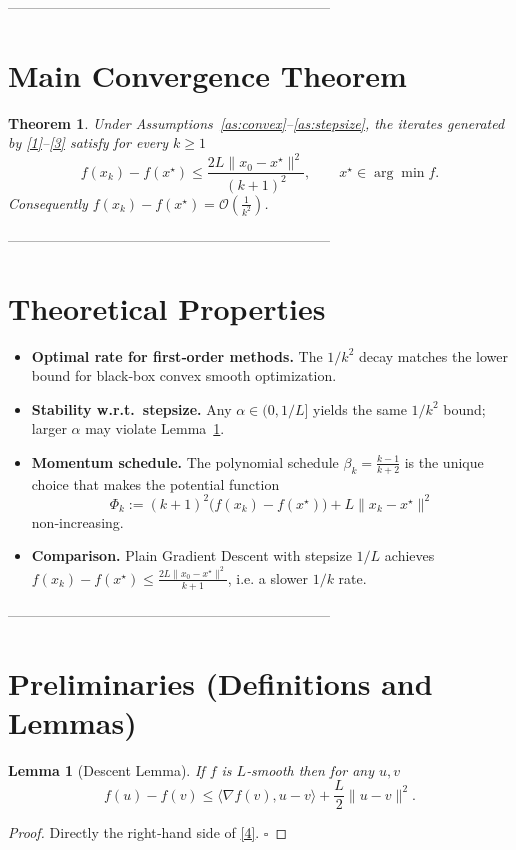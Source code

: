 \documentclass{article}
\newtheorem{theorem}{Theorem}
\newtheorem{lemma}{Lemma}
\newcommand{\grad}{\nabla}
\begin{document}
---------------------------------------------------------------------

\section*{Main Convergence Theorem}
\begin{theorem}\label{thm:rate}
Under Assumptions~\ref{as:convex}–\ref{as:stepsize}, the iterates generated by \eqref{1}–\eqref{3} satisfy for every $k\ge 1$
\[
f(x_k)-f(x^\star)\le \frac{2L\|x_0-x^\star\|^2}{(k+1)^2},
\qquad x^\star\in\arg\min f .
\tag{5}
\]
Consequently $f(x_k)-f(x^\star)=\mathcal{O}\!\left(\frac{1}{k^{2}}\right)$.
\end{theorem}

---------------------------------------------------------------------

\section*{Theoretical Properties}
\begin{itemize}
\item \textbf{Optimal rate for first‑order methods.}  The $1/k^{2}$ decay matches the lower bound for black‑box convex smooth optimization.
\item \textbf{Stability w.r.t.\ stepsize.}  Any $\alpha\in(0,1/L]$ yields the same $1/k^{2}$ bound; larger $\alpha$ may violate Lemma~\ref{lem:descent}.
\item \textbf{Momentum schedule.}  The polynomial schedule $\beta_k=\frac{k-1}{k+2}$ is the unique choice that makes the potential function
\[
\Phi_k:= (k+1)^2\bigl(f(x_k)-f(x^\star)\bigr)+L\|x_k-x^\star\|^2
\]
non‑increasing.
\item \textbf{Comparison.}  Plain Gradient Descent with stepsize $1/L$ achieves $f(x_k)-f(x^\star)\le \frac{2L\|x_0-x^\star\|^2}{k+1}$, i.e. a slower $1/k$ rate.
\end{itemize}

---------------------------------------------------------------------

\section*{Preliminaries (Definitions and Lemmas)}
\begin{lemma}[Descent Lemma]\label{lem:descent}
If $f$ is $L$‑smooth then for any $u,v$
\[
f(u)-f(v)\le \langle\grad f(v),u-v\rangle+\frac{L}{2}\|u-v\|^2 .
\]
\end{lemma}
\begin{proof}
Directly the right‑hand side of \eqref{4}. \hfill $\square$
\end{proof}
\end{document}
